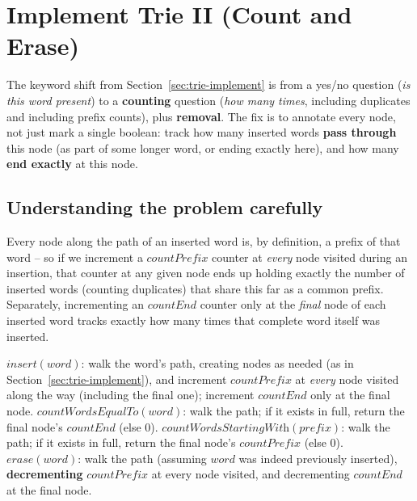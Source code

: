 \section{Implement Trie II (Count and Erase)}
\label{sec:trie-implement-2}


\begin{patternbox}
The keyword shift from Section~\ref{sec:trie-implement} is from a
yes/no question (\emph{is this word present}) to a \textbf{counting}
question (\emph{how many times}, including duplicates and including
prefix counts), plus \textbf{removal}. The fix is to annotate every node,
not just mark a single boolean: track how many inserted words
\textbf{pass through} this node (as part of some longer word, or ending
exactly here), and how many \textbf{end exactly} at this node.
\end{patternbox}

\subsection*{Understanding the problem carefully}

Every node along the path of an inserted word is, by definition, a
prefix of that word -- so if we increment a $\textit{countPrefix}$
counter at \emph{every} node visited during an insertion, that counter at
any given node ends up holding exactly the number of inserted words
(counting duplicates) that share this far as a common prefix. Separately,
incrementing an $\textit{countEnd}$ counter only at the \emph{final} node
of each inserted word tracks exactly how many times that complete word
itself was inserted.

\begin{ideabox}
$\textit{insert}(word)$: walk the word's path, creating nodes as needed
(as in Section~\ref{sec:trie-implement}), and increment
$\textit{countPrefix}$ at \emph{every} node visited along the way
(including the final one); increment $\textit{countEnd}$ only at the
final node. $\textit{countWordsEqualTo}(word)$: walk the path; if it
exists in full, return the final node's $\textit{countEnd}$ (else $0$).
$\textit{countWordsStartingWith}(prefix)$: walk the path; if it exists in
full, return the final node's $\textit{countPrefix}$ (else $0$).
$\textit{erase}(word)$: walk the path (assuming $word$ was indeed
previously inserted), \textbf{decrementing} $\textit{countPrefix}$ at
every node visited, and decrementing $\textit{countEnd}$ at the final
node.
\end{ideabox}

